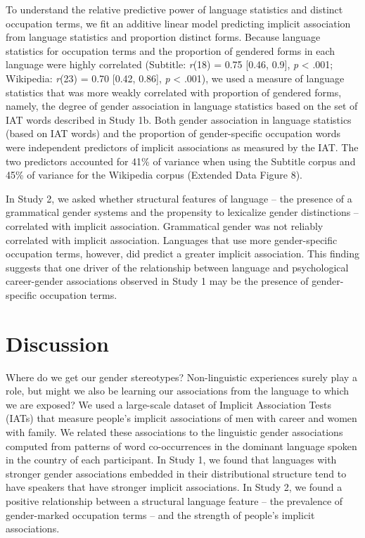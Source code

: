 \documentclass[11pt]{wlscirep}
\begin{document}
To understand the relative predictive power of language statistics and
distinct occupation terms, we fit an additive linear model predicting implicit association
from language statistics and proportion distinct forms. Because language statistics for occupation terms and
the proportion of gendered forms in each language were highly correlated (Subtitle: \emph{r}(18)  = 0.75 {[}0.46, 0.9{]}, \emph{p}
\textless{} .001; Wikipedia: \emph{r}(23) =
0.70  {[}0.42, 0.86{]}, \emph{p} \textless{} .001), we used a measure of language statistics that was more weakly correlated with proportion of gendered forms, namely, the degree of gender association in language statistics
based on the set of IAT words described in Study 1b. Both
gender association in language statistics (based on IAT words) and the
proportion of gender-specific occupation words were independent
predictors of implicit associations as measured by the IAT. The two predictors accounted for 41\% of
variance when using the Subtitle corpus and 45\% of
variance for the Wikipedia corpus (Extended Data Figure 8).

In Study 2, we asked whether structural features of language -- the
presence of a grammatical gender systems and the propensity to
lexicalize gender distinctions -- correlated with implicit association.
Grammatical gender was not reliably correlated with implicit association.
Languages that use more gender-specific occupation terms, however, did
predict a greater implicit association. This finding suggests that one driver of the relationship between language and psychological career-gender associations observed in Study 1 may be the presence of gender-specific occupation terms. 

\section*{Discussion}\label{general-discussion}

Where do we get our gender stereotypes? Non-linguistic experiences surely play a role, but might we also be learning our associations from the language to which we are exposed? We used a large-scale dataset of Implicit Association Tests (IATs) that measure people's implicit associations of men with career and women with family. We related these associations to the linguistic gender associations computed from patterns of word co-occurrences in the dominant language spoken in the country of each participant. In Study 1, we found that languages with stronger gender associations embedded in their distributional structure tend to have speakers that have stronger implicit associations. In Study 2, we found a positive relationship between a structural language feature – the prevalence of gender-marked occupation terms – and the strength of people's implicit associations. 
\end{document}
